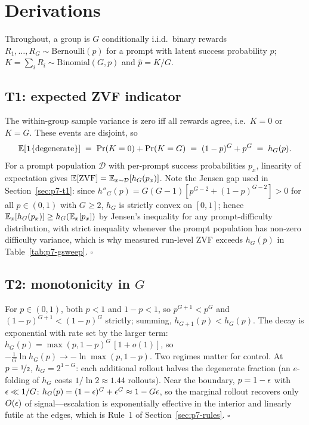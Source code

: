 \section{Derivations}
\label{sec:p7-appendix}
Throughout, a group is $G$ conditionally i.i.d.\ binary rewards
$R_1, \dots, R_G \sim \mathrm{Bernoulli}(p)$ for a prompt with latent
success probability $p$; $K = \sum_i R_i \sim \mathrm{Binomial}(G, p)$ and
$\hat p = K/G$.

\subsection{T1: expected ZVF indicator}
\label{sec:p7-appendix-t1}
The within-group sample variance is zero iff all rewards agree, i.e.\
$K = 0$ or $K = G$. These events are disjoint, so
\begin{equation}
  \mathbb{E}[\mathbf{1}\{\text{degenerate}\}]
  \;=\; \Pr(K = 0) + \Pr(K = G)
  \;=\; (1-p)^G + p^G
  \;=\; h_G(p).
\end{equation}
For a prompt population $\mathcal{D}$ with per-prompt success probabilities
$p_x$, linearity of expectation gives
$\mathbb{E}[\mathrm{ZVF}] = \mathbb{E}_{x \sim \mathcal{D}}[h_G(p_x)]$. Note the Jensen gap
used in Section~\ref{sec:p7-t1}: since $h''_G(p) = G(G-1)[p^{G-2} + (1-p)^{G-2}] > 0$
for all $p \in (0,1)$ with $G \geq 2$, $h_G$ is strictly convex on $[0,1]$;
hence $\mathbb{E}_x[h_G(p_x)] \geq h_G(\mathbb{E}_x[p_x])$ by Jensen's inequality for any
prompt-difficulty distribution, with strict inequality whenever the prompt population
has non-zero difficulty variance, which is why measured run-level ZVF exceeds
$h_G(\bar p)$ in Table~\ref{tab:p7-gsweep}. \hfill$\square$

\subsection{T2: monotonicity in \texorpdfstring{$G$}{G}}
\label{sec:p7-appendix-t2}
For $p \in (0,1)$, both $p < 1$ and $1-p < 1$, so $p^{G+1} < p^G$ and
$(1-p)^{G+1} < (1-p)^G$ strictly; summing,
$h_{G+1}(p) < h_G(p)$. The decay is exponential with rate set by the larger
term: $h_G(p) = \max(p, 1-p)^G\,[1 + o(1)]$, so
$-\frac{1}{G}\ln h_G(p) \to -\ln \max(p, 1-p)$. Two regimes matter for
control. At $p = \nicefrac12$, $h_G = 2^{1-G}$: each additional rollout
halves the degenerate fraction (an $e$-folding of $h_G$ costs
$1/\ln 2 \approx 1.44$ rollouts). Near the boundary, $p = 1 - \epsilon$ with
$\epsilon \ll 1/G$: $h_G(p) = (1-\epsilon)^G + \epsilon^G \approx 1 - G\epsilon$, so the
marginal rollout recovers only $O(\epsilon)$ of signal---escalation is
exponentially effective in the interior and linearly futile at the edges,
which is Rule~1 of Section~\ref{sec:p7-rules}. \hfill$\square$

